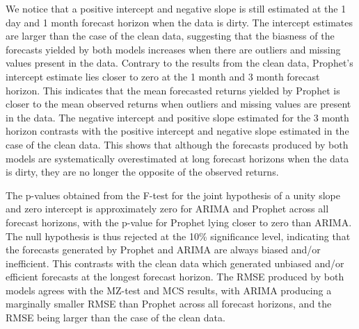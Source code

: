 \documentclass[12pt,a4paper]{article}
\numberwithin{equation}{section}
\numberwithin{figure}{section}
\numberwithin{table}{section}
\let\origtable\table
\let\endorigtable\endtable
\renewenvironment{table}[1][2] {
    \expandafter\origtable\expandafter[H]
} {
    \endorigtable
}
\begin{document}
\begin{table}[H]
\centering
\caption{MCS, MZ-test and RMSE results based on dirty data \label{tab2}} 
\end{table}

We notice that a positive intercept and negative slope is still
estimated at the 1 day and 1 month forecast horizon when the data is
dirty. The intercept estimates are larger than the case of the clean
data, suggesting that the biasness of the forecasts yielded by both
models increases when there are outliers and missing values present in
the data. Contrary to the results from the clean data, Prophet's
intercept estimate lies closer to zero at the 1 month and 3 month
forecast horizon. This indicates that the mean forecasted returns
yielded by Prophet is closer to the mean observed returns when outliers
and missing values are present in the data. The negative intercept and
positive slope estimated for the 3 month horizon contrasts with the
positive intercept and negative slope estimated in the case of the clean
data. This shows that although the forecasts produced by both models are
systematically overestimated at long forecast horizons when the data is
dirty, they are no longer the opposite of the observed returns.

The p-values obtained from the F-test for the joint hypothesis of a
unity slope and zero intercept is approximately zero for ARIMA and
Prophet across all forecast horizons, with the p-value for Prophet lying
closer to zero than ARIMA. The null hypothesis is thus rejected at the
10\% significance level, indicating that the forecasts generated by
Prophet and ARIMA are always biased and/or inefficient. This contrasts
with the clean data which generated unbiased and/or efficient forecasts
at the longest forecast horizon. The RMSE produced by both models agrees
with the MZ-test and MCS results, with ARIMA producing a marginally
smaller RMSE than Prophet across all forecast horizons, and the RMSE
being larger than the case of the clean data.
\end{document}
